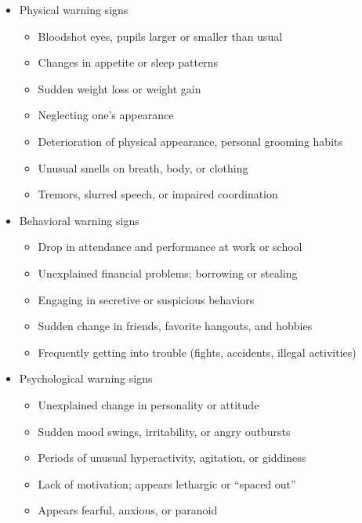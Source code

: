 \documentclass{report}
\begin{document}
\begin{itemize}
    \item Physical warning signs 
    \begin{itemize}
    \item Bloodshot eyes, pupils larger or smaller than usual
    \item Changes in appetite or sleep patterns
    \item Sudden weight loss or weight gain
    \item Neglecting one’s appearance
    \item Deterioration of physical appearance, personal grooming habits
    \item Unusual smells on breath, body, or clothing
    \item Tremors, slurred speech, or impaired coordination
    \end{itemize}

    \item Behavioral warning signs
    \begin{itemize}
    \item Drop in attendance and performance at work or school
    \item Unexplained financial problems; borrowing or stealing
    \item Engaging in secretive or suspicious behaviors
    \item Sudden change in friends, favorite hangouts, and hobbies
    \item Frequently getting into trouble (fights, accidents, illegal activities)
    \end{itemize}
    
    \item Psychological warning signs 
    \begin{itemize}
    \item Unexplained change in personality or attitude
    \item Sudden mood swings, irritability, or angry outbursts
    \item Periods of unusual hyperactivity, agitation, or giddiness
    \item Lack of motivation; appears lethargic or “spaced out”
    \item Appears fearful, anxious, or paranoid
    \end{itemize}

\end{itemize}
\end{document}
